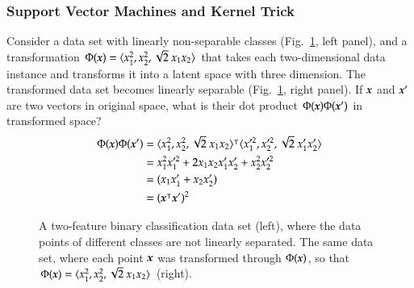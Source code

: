 \begin{refsection}
\subsubsection*{Support Vector Machines and Kernel Trick}

Consider a data set with linearly non-separable classes (Fig.~\ref{fig:svm-circle}, left panel), and a transformation $\Phi(\boldsymbol{x})=\langle x_1^2, x_2^2, \sqrt{2}\ x_1 x_2\rangle$ that takes each two-dimensional data instance and transforms it into a latent space with three dimension. The transformed data set becomes linearly separable (Fig.~\ref{fig:svm-circle}, right panel). If $\boldsymbol{x}$ and $\boldsymbol{x}'$ are two vectors in original space, what is their dot product $\Phi(\boldsymbol{x})\Phi(\boldsymbol{x}')$ in transformed space?
\begin{align*}
\Phi(\vect{x})\Phi(\vect{x}') & = \langle x_1^2, x_2^2, \sqrt{2}\ x_1 x_2\rangle^\tr \langle x_1'^2, x_2'^2, \sqrt{2}\ x_1' x_2'\rangle \\
& = x_1^2 x_1'^2 + 2 x_1 x_2 x_1' x_2' + x_2^2 x_2'^2 \\
& = (x_1 x_1' + x_2 x_2') \\
& = (\vect{x}^\tr \vect{x}')^2
\end{align*}

\begin{figure}[htbp]
\caption{A two-feature binary classification data set (left), where the data points of different classes are not linearly separated. The same data set, where each point $\boldsymbol{x}$ was transformed through $\Phi(\boldsymbol{x})$, so that $\Phi(\boldsymbol{x})=\langle x_1^2, x_2^2, \sqrt{2}\ x_1 x_2\rangle$ (right).}
\label{fig:svm-circle}
\end{figure}


\end{refsection}
